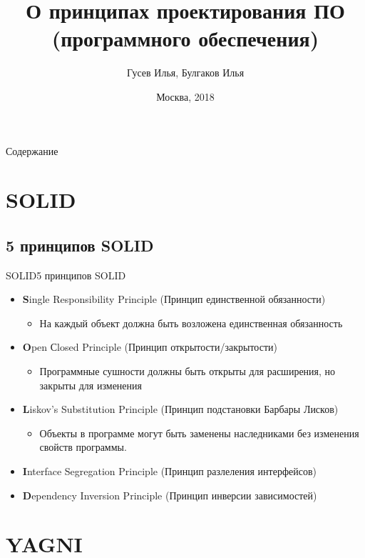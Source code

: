 \documentclass[10pt]{beamer}
\title[\href{https://goo.gl/NRgp8K}{https://goo.gl/NRgp8K} (Term 1)]{О принципах проектирования ПО (программного обеспечения)}
\author[Гусев Илья, Булгаков Илья]{Гусев Илья, Булгаков Илья}
\institute[МФТИ] 
{Московский физико-технический институт\\*}
\date{Москва, 2018}
\begin{document}
\begin{frame}
  \titlepage
\end{frame}

\begin{frame}{Содержание}
\tableofcontents
\end{frame}

\section{SOLID}
\subsection{5 принципов SOLID}

\begin{frame}[fragile]{SOLID}{5 принципов SOLID}
    \begin{itemize}
        \item \textbf{S}ingle Responsibility Principle (Принцип единственной обязанности)
        \begin{itemize}
            \item На каждый объект должна быть возложена единственная обязанность
        \end{itemize}
        \item \textbf{O}pen Сlosed Principle (Принцип открытости/закрытости)
        \begin{itemize}
            \item Программные сушности должны быть открыты для расширения, но закрыты для изменения
        \end{itemize}
        \item \textbf{L}iskov’s Substitution Principle (Принцип подстановки Барбары Лисков)
        \begin{itemize}
            \item Объекты в программе могут быть заменены наследниками без изменения свойств программы.
        \end{itemize}
        \item \textbf{I}nterface Segregation Principle (Принцип разлеления интерфейсов)
        \item \textbf{D}ependency Inversion Principle (Принцип инверсии зависимостей)
    \end{itemize}
\end{frame}

\section{YAGNI}
\end{document}
